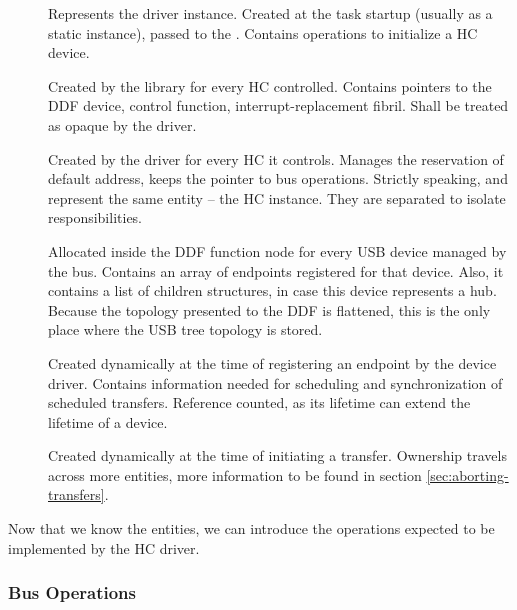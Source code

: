 \begin{description}
	\item[]
		Represents the driver instance. Created at the task startup (usually as
		a static instance), passed to the . Contains
		operations to initialize a HC device.
	\item[]
		Created by the library for every HC controlled. Contains pointers to
		the DDF device, control function, interrupt-replacement fibril. Shall
		be treated as opaque by the driver.
	\item[]
		Created by the driver for every HC it controls. Manages the reservation
		of default address, keeps the pointer to bus operations. Strictly
		speaking,  and  represent the same
		entity -- the HC instance. They are separated to isolate responsibilities.
	\item[]
		Allocated inside the DDF function node for every USB device managed by
		the bus. Contains an array of endpoints registered for that device.
		Also, it contains a list of children  structures, in
		case this device represents a hub. Because the topology presented to
		the DDF is flattened, this is the only place where the USB tree
		topology is stored.
	\item[]
		Created dynamically at the time of registering an endpoint by the
		device driver. Contains information needed for scheduling and
		synchronization of scheduled transfers. Reference counted, as its
		lifetime can extend the lifetime of a device.
	\item[]
		Created dynamically at the time of initiating a transfer. Ownership
		travels across more entities, more information to be found in section
		\ref{sec:aborting-transfers}.
\end{description}

Now that we know the entities, we can introduce the operations expected to be
implemented by the HC driver.

\subsubsection{Bus Operations}

